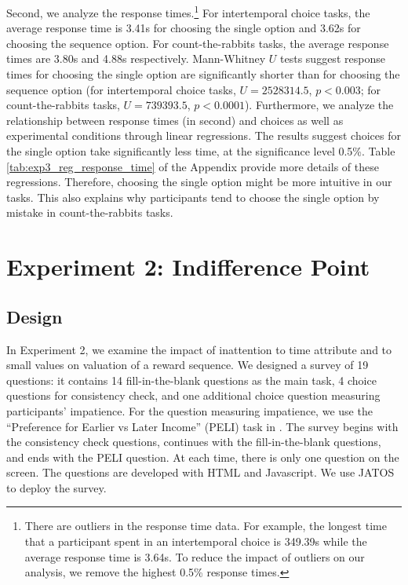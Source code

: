 \documentclass[
  12pt,
]{article}
\begin{document}
Second, we analyze the response times.\footnote{There are outliers in
  the response time data. For example, the longest time that a
  participant spent in an intertemporal choice is 349.39s while the
  average response time is 3.64s. To reduce the impact of outliers on
  our analysis, we remove the highest 0.5\% response times.} For
intertemporal choice tasks, the average response time is 3.41s for
choosing the single option and 3.62s for choosing the sequence option.
For count-the-rabbits tasks, the average response times are 3.80s and
4.88s respectively. Mann-Whitney \(U\) tests suggest response times for
choosing the single option are significantly shorter than for choosing
the sequence option (for intertemporal choice tasks, \(U = 2528314.5\),
\(p<0.003\); for count-the-rabbits tasks, \(U=739393.5\), \(p<0.0001\)).
Furthermore, we analyze the relationship between response times (in
second) and choices as well as experimental conditions through linear
regressions. The results suggest choices for the single option take
significantly less time, at the significance level 0.5\%. Table
\ref{tab:exp3_reg_response_time} of the Appendix provide more details of
these regressions. Therefore, choosing the single option might be more
intuitive in our tasks. This also explains why participants tend to
choose the single option by mistake in count-the-rabbits tasks.

\hypertarget{experiment-2-indifference-point}{%
\section{Experiment 2: Indifference
Point}\label{experiment-2-indifference-point}}

\hypertarget{design-1}{%
\subsection{Design}\label{design-1}}

In Experiment 2, we examine the impact of inattention to time attribute
and to small values on valuation of a reward sequence. We designed a
survey of 19 questions: it contains 14 fill-in-the-blank questions as
the main task, 4 choice questions for consistency check, and one
additional choice question measuring participants' impatience. For the
question measuring impatience, we use the ``Preference for Earlier vs
Later Income'' (PELI) task in \citet{burro2022patience}. The survey
begins with the consistency check questions, continues with the
fill-in-the-blank questions, and ends with the PELI question. At each
time, there is only one question on the screen. The questions are
developed with HTML and Javascript. We use JATOS \citep{lange2015just}
to deploy the survey.
\end{document}
